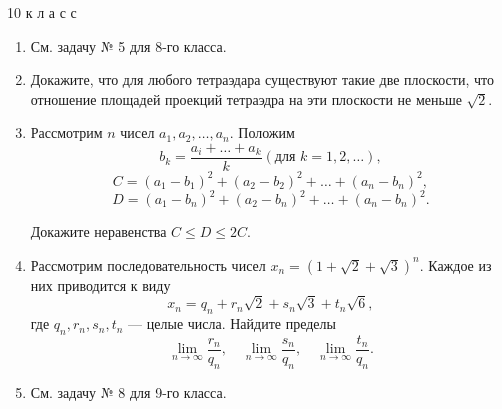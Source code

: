 \setcounter{page}{67}
\begin{minipage}[10cm]{\textwidth}
    \setlength\columnsep{20pt}
    \setlength\parindent{24pt}
    \begin{multicols*}{2}
    10 к л а с с
    
    \begin{enumerate}[itemindent=32pt]
      \setlength{\itemsep}{0pt}
      \setlength{\parskip}{0pt}
      \setcounter{enumi}{4}
      
      \item См. задачу № 5 для 8-го класса.
      \item Докажите, что для любого тетраэдара существуют такие две плоскости, что отношение площадей проекций тетраэдра на эти плоскости не меньше $ \sqrt{2} $.
      \item Рассмотрим $n$ чисел $a_1, a_2, \dots, a_n$.
      Положим
    \[b_k = \frac{a_i + \dots + a_k}{k}  (\textrm{для } k = 1, 2, \dots) ,\] 
    \[C = (a_1 - b_1)^2 + (a_2 - b_2)^2  + \dots + (a_n - b_n)^2,\] 
    \[D = (a_1 - b_n)^2 + (a_2 - b_n)^2  + \dots + (a_n - b_n)^2. \]
    
    Докажите неравенства $ C \le D \le 2C $.
    
    \item Рассмотрим последовательность чисел $ x_n = (1 + \sqrt{2} + \sqrt{3})^n $.  Каждое из них приводится к виду
    \[ x_n = q_n + r_n\sqrt{2} + s_n\sqrt{3} + t_n\sqrt{6},\]
    где $q_n, r_n, s_n, t_n$ --- целые числа. Найдите пределы
    \[ \lim_{n\to\infty} \frac{r_n}{q_n},\quad \lim_{n\to\infty} \frac{s_n}{q_n}, \quad \lim_{n\to\infty} \frac{t_n}{q_n}. \]
    
    \item См. задачу № 8 для 9-го класса.
    \end{enumerate}
    

\end{multicols*}
\end{minipage}
